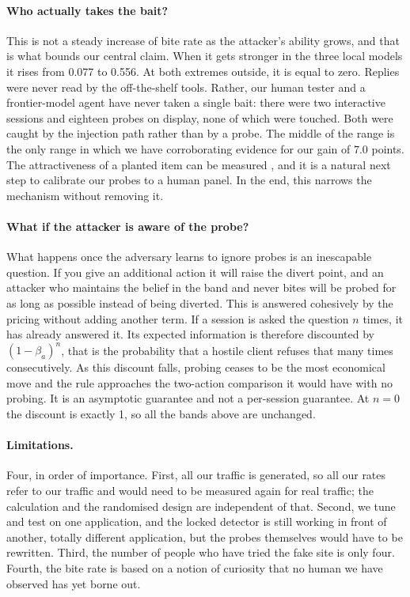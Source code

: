 \documentclass[runningheads]{llncs}
\begin{document}
\paragraph{Who actually takes the bait?} This is not a steady increase of bite rate as the attacker's ability grows, and that is what bounds our central claim. When it gets stronger in the three local models it rises from 0.077 to 0.556. At both extremes outside, it is equal to zero. Replies were never read by the off-the-shelf tools. Rather, our human tester and a frontier-model agent have never taken a single bait: there were two interactive sessions and eighteen probes on display, none of which were touched. Both were caught by the injection path rather than by a probe. The middle of the range is the only range in which we have corroborating evidence for our gain of 7.0 points. The attractiveness of a planted item can be measured \cite{kahlhofer2024honeyquest}, and it is a natural next step to calibrate our probes to a human panel. In the end, this narrows the mechanism without removing it.

\paragraph{What if the attacker is aware of the probe?} What happens once the adversary learns to ignore probes is an inescapable question. If you give an additional action it will raise the divert point, and an attacker who maintains the belief in the band and never bites will be probed for as long as possible instead of being diverted. This is answered cohesively by the pricing without adding another term. If a session is asked the question $n$ times, it has already answered it. Its expected information is therefore discounted by $(1-\beta_a)^n$, that is the probability that a hostile client refuses that many times consecutively. As this discount falls, probing ceases to be the most economical move and the rule approaches the two-action comparison it would have with no probing. It is an asymptotic guarantee and not a per-session guarantee. At $n = 0$ the discount is exactly 1, so all the bands above are unchanged.

\paragraph{Limitations.} Four, in order of importance. First, all our traffic is generated, so all our rates refer to our traffic and would need to be measured again for real traffic; the calculation and the randomised design are independent of that. Second, we tune and test on one application, and the locked detector is still working in front of another, totally different application, but the probes themselves would have to be rewritten. Third, the number of people who have tried the fake site is only four. Fourth, the bite rate is based on a notion of curiosity that no human we have observed has yet borne out.
\end{document}
